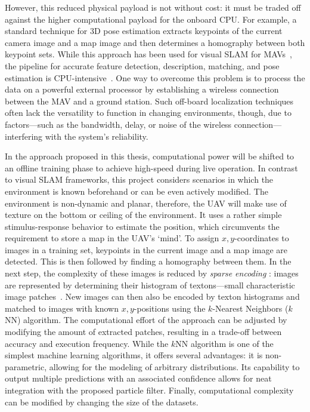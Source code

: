 However, this reduced physical payload is not without cost: it must be
traded off against the higher computational payload for the onboard
CPU. For example, a standard technique for 3D pose estimation extracts
keypoints of the current camera image and a map image and then
determines a homography between both keypoint sets. While this
approach has been used for visual SLAM for
MAVs~\cite{blosch2010vision}, the pipeline for accurate feature
detection, description, matching, and pose estimation is
CPU-intensive~\cite{kendall2015convolutional}.
One way to overcome this problem is to process the data on a powerful
external processor by establishing a wireless connection between the
MAV and a ground station. Such off-board localization techniques often
lack the versatility to function in changing environments, though, due
to factors---such as the bandwidth, delay, or noise of the wireless
connection---interfering with the system's reliability.

In the approach proposed in this thesis, computational power will be
shifted to an offline training phase to achieve high-speed during live
operation. In contrast to visual SLAM frameworks, this project considers
scenarios in which the environment is known beforehand or can be even
actively modified. The environment is non-dynamic and planar, therefore, the UAV will make use of texture on the bottom or ceiling of the environment.
 It uses a rather simple stimulus-response behavior to
estimate the position, which circumvents the requirement to store a
map in the UAV's `mind'. To assign $x,y$-coordinates to images in a
training set, keypoints in the current image and a map image are
detected. This is then followed by finding a homography between
them. In the next step, the complexity of these images is reduced by
\emph{sparse encoding} : images are represented by determining their
histogram of textons---small characteristic image
patches~\cite{varma2005statistical}.
New images can then also be encoded by texton histograms and matched
to images with known $x,y$-positions using the $k$-Nearest Neighbors
($k$NN) algorithm. The computational effort of the approach can be
adjusted by modifying the amount of extracted patches, resulting in a
trade-off between accuracy and execution frequency. While the $k$NN
algorithm is one of the simplest machine learning algorithms, it
offers several advantages: it is non-parametric, allowing for the
modeling of arbitrary distributions. Its capability to output multiple
predictions with an associated confidence allows for neat integration
with the proposed particle filter. Finally, computational complexity
can be modified by changing the size of the datasets.


